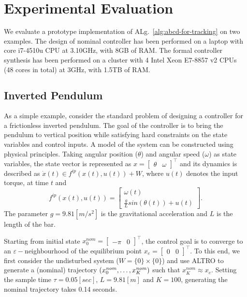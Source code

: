 
\section{Experimental Evaluation}\label{sec:experiments}
We evaluate a prototype implementation of ALg.~\ref{alg:abcd-for-tracking}
on two examples. 
The design of nominal controller has been performed on a laptop with core i7-4510u CPU at 3.10GHz, with 8GB of
RAM.
The formal controller synthesis has been performed
on a cluster with 4 Intel Xeon E7-8857 v2 CPUs (48 cores in total) at 3GHz, with 1.5TB of
RAM.
\subsection{Inverted Pendulum}\label{subsec:invpend}
As a simple example, consider the standard problem of designing a controller for a frictionless inverted pendulum.
The goal of the controller is to bring the pendulum to vertical position while satisfying hard constraints on the state variables and control inputs.
A model of the system can be constructed using physical principles. Taking angular position ($\theta$) and angular speed ($\omega$) as state variables, the state vector is represented as $x=\begin{bmatrix}\theta&\omega\end{bmatrix}^\top$ and its dynamics is described as $\dot x(t)\in f^{ip}(x(t),u(t))+W$, where $u(t)$ denotes the input torque, at time $t$ and
\begin{equation}\label{eq:inv_pend_ss}
	f^{ip}(x(t),u(t))=\begin{bmatrix}\omega(t)\\\frac{g}{L}sin(\theta(t))+u(t)\end{bmatrix}.
\end{equation}
The parameter $g=9.81 [m/s^2]$ is the gravitational acceleration
and $L$ is the length of the bar. 

Starting from initial state $x_0^{nom}=\begin{bmatrix}-\pi&0\end{bmatrix}^\top$, the control goal is to converge to an $\varepsilon-$neighbourhood of the equilibrium point 
$x_e=\begin{bmatrix}0&0\end{bmatrix}^\top$. To this end, we first consider the undisturbed system ($W=\{0\}\times \{0\}$)  and use ALTRO to generate a (nominal) trajectory $(x_0^{\mathit{nom}},\ldots,x_K^{\mathit{nom}})$ such that $x_K^{nom}\approx x_e$. Setting the sample time $\tau=0.05[sec]$, $L=9.81[m]$ and $K=100$, generating the nominal trajectory takes 0.14 seconds.




